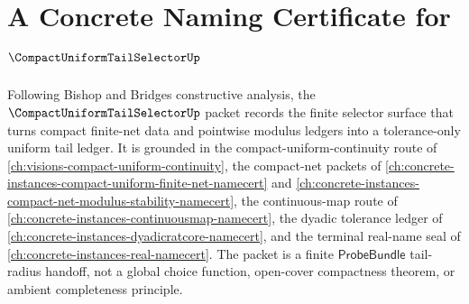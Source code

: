 \chapter{A Concrete Naming Certificate for $\CompactUniformTailSelectorUp$}
\label{ch:concrete-instances-compact-uniform-tail-selector-namecert}

Following Bishop and Bridges constructive analysis, the $\CompactUniformTailSelectorUp$ packet records the finite selector surface that turns compact finite-net data and pointwise modulus ledgers into a tolerance-only uniform tail ledger. It is grounded in the compact-uniform-continuity route of \autoref{ch:visions-compact-uniform-continuity}, the compact-net packets of \autoref{ch:concrete-instances-compact-uniform-finite-net-namecert} and \autoref{ch:concrete-instances-compact-net-modulus-stability-namecert}, the continuous-map route of \autoref{ch:concrete-instances-continuousmap-namecert}, the dyadic tolerance ledger of \autoref{ch:concrete-instances-dyadicratcore-namecert}, and the terminal real-name seal of \autoref{ch:concrete-instances-real-namecert}. The packet is a finite $\mathsf{ProbeBundle}$ tail-radius handoff, not a global choice function, open-cover compactness theorem, or ambient completeness principle.

